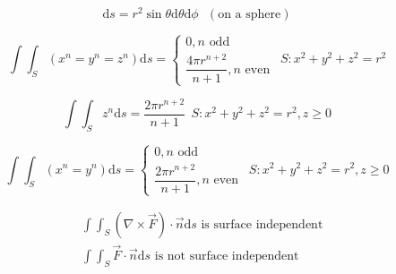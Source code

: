 \documentclass[12pt]{article}
\newcommand \dstyle \displaystyle
\renewcommand \d {\mathrm d}
\newcommand \ds {\d s}
\renewcommand \iint {\int \!\!\! \int}
\begin{document}
\begin{equation}
	\ds = r^2 \sin \theta \d\theta \d\phi ~~~ (\text{on a sphere})
\end{equation}

\begin{equation}
	\iint_S (x^n = y^n = z^n) \ds = \begin{cases}
		0, \text{$n$ odd}\\
		\dfrac{4 \pi r^{n + 2}}{n + 1}, \text{$n$ even}
	\end{cases} ~~ S : x^2 + y^2 + z^2 = r^2
\end{equation}

\begin{equation}
	\iint_S z^n \ds = \dfrac{2 \pi r^{n + 2}}{n + 1} ~~ S : x^2 + y^2 + z^2 = r^2, z \ge 0
\end{equation}

\begin{equation}
	\iint_S (x^n = y^n) \ds = \begin{cases}
		0, \text{$n$ odd}\\
		\dfrac{2 \pi r^{n + 2}}{n + 1}, \text{$n$ even}
	\end{cases} ~~ S : x^2 + y^2 + z^2 = r^2, z \ge 0
\end{equation}

\vspace{-20px}
\begin{align*}
	& \text{$\dstyle \iint_S (\nabla \times \vec F) \cdot \vec n\ds$ is surface independent} \\
	& \text{$\dstyle \iint_S \vec F \cdot \vec n\ds$ is not surface independent}
\end{align*}
\end{document}
